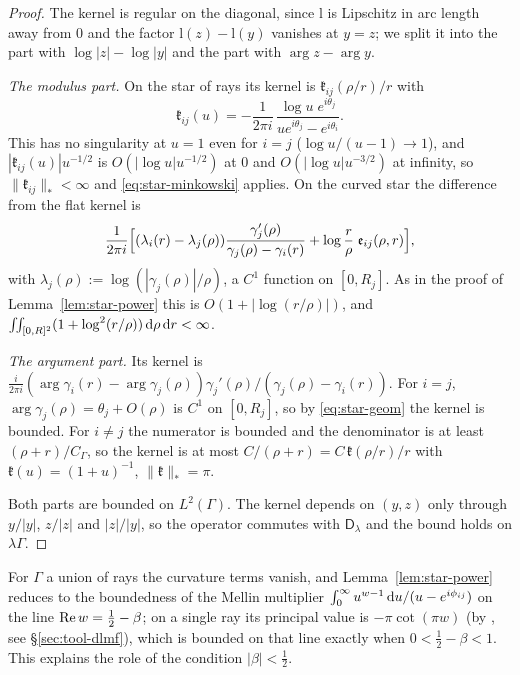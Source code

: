 \begin{proof}
The kernel is regular on the diagonal, since $\mathrm l$ is Lipschitz in arc length away from $0$ and the factor
$\mathrm l(z)-\mathrm l(y)$ vanishes at $y=z$; we split it into the part with $\log|z|-\log|y|$ and the part with
$\arg z-\arg y$.

\emph{The modulus part.} On the star of rays its kernel is $\mathfrak k_{ij}(\rho/r)/r$ with
\[
  \mathfrak k_{ij}(u)=-\frac1{2\pi i}\,\frac{\log u\;e^{i\theta_j}}{ue^{i\theta_j}-e^{i\theta_i}} .
\]
This has no singularity at
$u=1$ even for $i=j$ ($\log u/(u-1)\to1$), and $|\mathfrak k_{ij}(u)|u^{-1/2}$ is $O(|\log u|u^{-1/2})$ at $0$ and
$O(|\log u|u^{-3/2})$ at infinity, so $\|\mathfrak k_{ij}\|_*<\infty$ and \eqref{eq:star-minkowski} applies. On the curved star
the difference from the flat kernel is
\[
  \frac1{2\pi i}\Bigl[(\lambda_i(r)-\lambda_j(\rho))\frac{\gamma_j'(\rho)}{\gamma_j(\rho)-\gamma_i(r)}
  +\log\frac r\rho\;\mathfrak e_{ij}(\rho,r)\Bigr],
\]
with $\lambda_j(\rho):=\log(|\gamma_j(\rho)|/\rho)$, a $C^1$ function on
$[0,R_j]$. As in the proof of Lemma~\ref{lem:star-power} this is $O(1+|\log(r/\rho)|)$, and
$\iint_{[0,R]^2}(1+\log^2(r/\rho))\,\mathrm{d}\rho\,\mathrm{d} r<\infty$.

\emph{The argument part.} Its kernel is $\frac{i}{2\pi i}(\arg\gamma_i(r)-\arg\gamma_j(\rho))\gamma_j'(\rho)/(\gamma_j(\rho)-
\gamma_i(r))$. For $i=j$, $\arg\gamma_j(\rho)=\theta_j+O(\rho)$ is $C^1$ on $[0,R_j]$, so by \eqref{eq:star-geom} the kernel is
bounded. For $i\ne j$ the numerator is bounded and the denominator is at least $(\rho+r)/C_\Gamma$, so the kernel is at most
$C/(\rho+r)=C\,\mathfrak k(\rho/r)/r$ with $\mathfrak k(u)=(1+u)^{-1}$, $\|\mathfrak k\|_*=\pi$.

Both parts are bounded on $L^2(\Gamma)$. The kernel depends on $(y,z)$ only through $y/|y|$, $z/|z|$ and $|z|/|y|$,
so the operator commutes with $\mathsf D_\lambda$ and the bound holds on $\lambda\Gamma$.
\end{proof}

\begin{remark}\label{rem:mellin}
For $\Gamma$ a union of rays the curvature terms vanish, and Lemma~\ref{lem:star-power} reduces to the boundedness of the
Mellin multiplier $\int_0^\infty u^{w-1}\,\mathrm{d} u/(u-e^{i\phi_{ij}})$ on the line $\operatorname{Re} w=\frac12-\beta$; on a single
ray its principal value is $-\pi\cot(\pi w)$ (by \cite[(5.12.3), (5.5.3)]{DLMF}, see \S\ref{sec:tool-dlmf}), which is
bounded on that line exactly when $0<\frac12-\beta<1$. This explains the role of the condition $|\beta|<\frac12$.
\end{remark}
